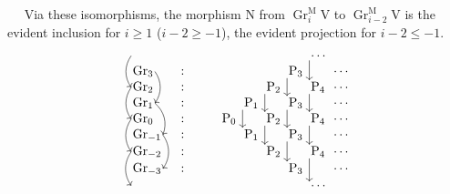 \documentclass[11pt,leqno]{article}
\newcommand{\Page}[1]{\ifvmode\noindent\else\unskip\ \fi{\footnotesize\textcolor{gray}{[p.\,#1]}}\ \ignorespaces}
\begin{document}
\Page{166}
Via these isomorphisms, the morphism \(\mathrm{N}\) from \(\operatorname{Gr}_i^{\mathrm{M}}\mathrm{V}\) to \(\operatorname{Gr}_{i-2}^{\mathrm{M}}\mathrm{V}\) is the evident inclusion for \(i\ge1\) (\(i-2\ge-1\)), the evident projection for \(i-2\le-1\).
\[
\begin{tikzcd}[
  ampersand replacement=\&,
  row sep=0.2em,
  column sep=0.4em,
  cells={nodes={anchor=west,inner sep=1pt}}
]
\phantom{\operatorname{Gr}_4}
  \arrow[dd,bend right=35,start anchor=west,end anchor=west]
  \&[0.8em] \&[2em] \& \& \& \&
  \cdots\arrow[dd,start anchor=south west,end anchor=north west] \& \\
\operatorname{Gr}_3
  \arrow[dd,bend left=35,start anchor=east,end anchor=east]
  \& \colon \& \& \& \&
  \mathrm{P}_3\arrow[dd,start anchor=south west,end anchor=north west]
  \& \& \cdots \\
\operatorname{Gr}_2
  \arrow[dd,bend right=35,start anchor=west,end anchor=west]
  \& \colon \& \& \&
  \mathrm{P}_2\arrow[dd,start anchor=south west,end anchor=north west]
  \& \&
  \mathrm{P}_4\arrow[dd,start anchor=south west,end anchor=north west]
  \& \cdots \\
\operatorname{Gr}_1
  \arrow[dd,bend left=35,start anchor=east,end anchor=east]
  \& \colon \& \&
  \mathrm{P}_1\arrow[dd,start anchor=south west,end anchor=north west]
  \& \&
  \mathrm{P}_3\arrow[dd,start anchor=south west,end anchor=north west]
  \& \& \cdots \\
\operatorname{Gr}_0
  \arrow[dd,bend right=35,start anchor=west,end anchor=west]
  \& \colon \& \mathrm{P}_0 \& \&
  \mathrm{P}_2\arrow[dd,start anchor=south west,end anchor=north west]
  \& \&
  \mathrm{P}_4\arrow[dd,start anchor=south west,end anchor=north west]
  \& \cdots \\
\operatorname{Gr}_{-1}
  \arrow[dd,bend left=35,start anchor=east,end anchor=east]
  \& \colon \& \& \mathrm{P}_1 \& \&
  \mathrm{P}_3\arrow[dd,start anchor=south west,end anchor=north west]
  \& \& \cdots \\
\operatorname{Gr}_{-2}
  \arrow[dd,bend right=35,start anchor=west,end anchor=west]
  \& \colon \& \& \& \mathrm{P}_2 \& \&
  \mathrm{P}_4\arrow[dd,start anchor=south west,end anchor=north west]
  \& \cdots \\
\operatorname{Gr}_{-3}
  \& \colon \& \& \& \& \mathrm{P}_3 \& \& \cdots \\
\phantom{\operatorname{Gr}_{-4}}
  \& \& \& \& \& \& \cdots \&
\end{tikzcd}
\]
\end{document}
